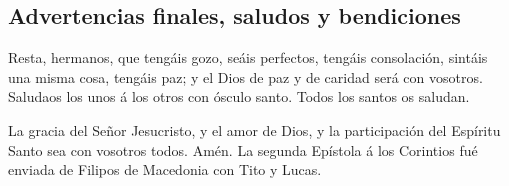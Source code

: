 \hypertarget{advertencias-finales-saludos-y-bendiciones}{%
\subsection{Advertencias finales, saludos y
bendiciones}\label{advertencias-finales-saludos-y-bendiciones}}

 Resta, hermanos, que tengáis gozo, seáis perfectos,
tengáis consolación, sintáis una misma cosa, tengáis paz; y el Dios de
paz y de caridad será con vosotros.  Saludaos los unos á
los otros con ósculo santo. Todos los santos os saludan.

 La gracia del Señor Jesucristo, y el amor de Dios, y la
participación del Espíritu Santo sea con vosotros todos. Amén. La
segunda Epístola á los Corintios fué enviada de Filipos de Macedonia con
Tito y Lucas. 
